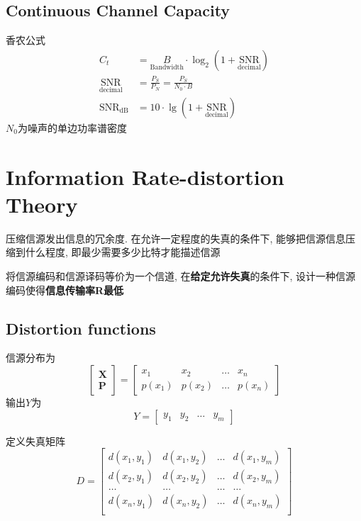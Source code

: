 \documentclass[a4paper]{report}
\begin{document}
\section{Continuous Channel Capacity}
香农公式
\begin{align*}
  C_t&=\underset{\text{Bandwidth}}{B}\cdot\log_2(1+\underset{\text{decimal}}{\text{SNR}})
  \\ \underset{\text{decimal}}{\text{SNR}}&=\frac{P_S}{P_N}=\frac{P_S}{N_0\cdot B}
  \\ \text{SNR}_{\text{dB}}&=10\cdot \lg(1+\underset{\text{decimal}}{\text{SNR}})
\end{align*}
$N_0$为噪声的单边功率谱密度

\chapter{
Information Rate-distortion Theory
}
压缩信源发出信息的冗余度. 在允许一定程度的失真的条件下, 能够把信源信息压缩到什么程度, 即最少需要多少比特才能描述信源

将信源编码和信源译码等价为一个信道, 
在\textbf{给定允许失真}的条件下, 设计一种信源编码使得\textbf{信息传输率R最低}
\section{Distortion functions}
信源分布为
\[
\begin{bmatrix}
  \textbf{X}\\\textbf{P}
\end{bmatrix}=
\begin{bmatrix}
  x_1 & x_2 & \dots & x_n\\
  p(x_1) & p(x_2)&\dots&p(x_n)
\end{bmatrix}
  \]
  输出$Y$为
  \[
    Y=\begin{bmatrix}
      y_1&y_2&\dots&y_m
    \end{bmatrix}
    \]

定义失真矩阵
\[
  D= \begin{bmatrix}
    d(x_1,y_1)&d(x_1,y_2)&\dots&d(x_1,y_m)\\
    d(x_2,y_1)&d(x_2,y_2)&\dots&d(x_2,y_m)\\
    \dots&\dots&\dots&\dots\\
    d(x_n,y_1)&d(x_n,y_2)&\dots&d(x_n,y_m)\\
  \end{bmatrix}
  \]


\end{document}
